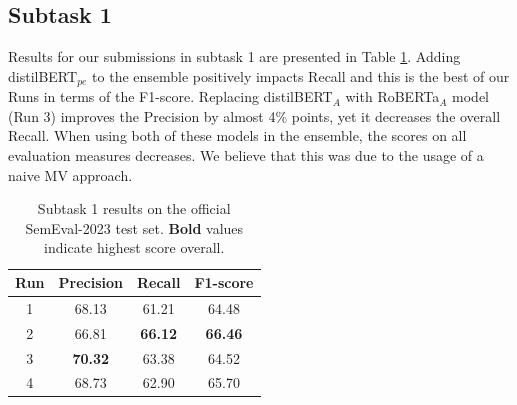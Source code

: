 \documentclass[11pt]{article}
\begin{document}
\subsection{Subtask 1}
\label{res:task1}
%
Results for our submissions in subtask 1 are presented in Table \ref{tab:task_1}. 
Adding  distilBERT$_{pe}$ to the ensemble positively impacts Recall and this is the best of our Runs in terms of the F1-score.
Replacing distilBERT$_A$ with RoBERTa$_A$ model (Run 3) improves the Precision by almost 4\% points, yet it decreases the overall Recall.
When using both of these models in the ensemble, the scores on all evaluation measures decreases. 
We believe that this was due to the usage of a naive MV approach.

%
\begin{table}[ht]
    \centering
    \begin{tabular}{cccc}
        \toprule
        Run & Precision & Recall & F1-score \\
        \midrule
        1 & 68.13 & 61.21 & 64.48 \\
        2 & 66.81 & \textbf{66.12} & \textbf{66.46} \\
        3 & \textbf{70.32} & 63.38 & 64.52 \\
        4 & 68.73 & 62.90 & 65.70 \\
        \bottomrule
    \end{tabular}
    \caption{Subtask 1 results on the official SemEval-2023 test set. \textbf{Bold} values indicate highest score overall.}
    \label{tab:task_1}
\end{table}
%
%
%
\end{document}
